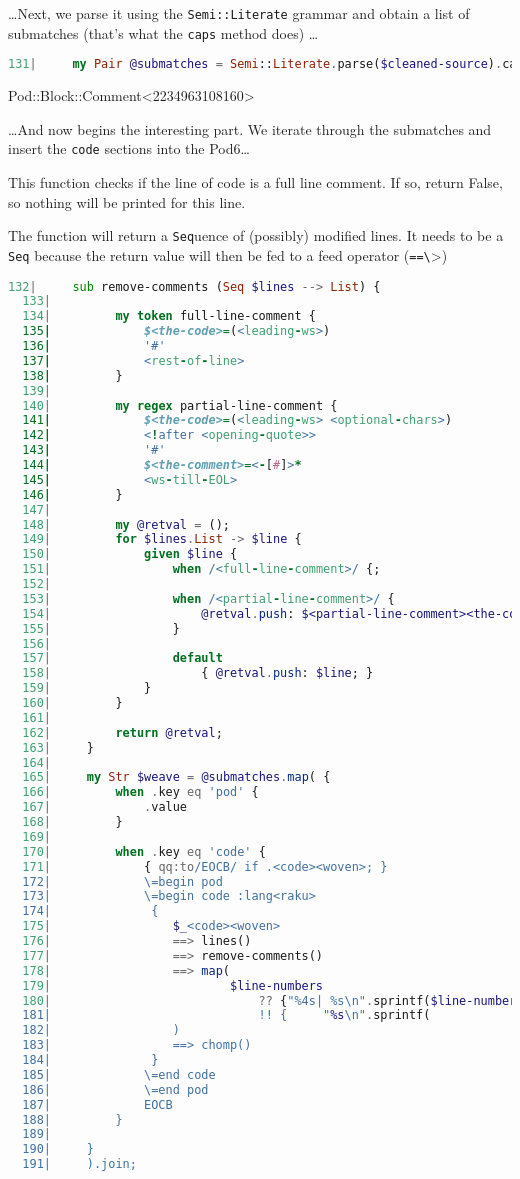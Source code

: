 \documentclass{scrartcl}
\begin{document}
…Next, we parse it using the \texttt{Semi::Literate} grammar and obtain a
list of submatches (that's what the \texttt{caps} method does) …

\begin{lstlisting}[language=Raku]
  131|     my Pair @submatches = Semi::Literate.parse($cleaned-source).caps;

\end{lstlisting}


Pod::Block::Comment<2234963108160>

…And now begins the interesting part. We iterate through the submatches and
insert the \texttt{code} sections into the Pod6…

This function checks if the line of code is a full line comment. If so,
return False, so nothing will be printed for this line.

The function will return a \texttt{Seq}uence of (possibly) modified lines.
It needs to be a \texttt{Seq} because the return value will then be fed to
a feed operator (\texttt{==\textbackslash }>)

\begin{lstlisting}[language=Raku]
  132|     sub remove-comments (Seq $lines --> List) {
  133| 
  134|         my token full-line-comment {
  135|             $<the-code>=(<leading-ws>)
  136|             '#'
  137|             <rest-of-line>
  138|         } 
  139| 
  140|         my regex partial-line-comment {
  141|             $<the-code>=(<leading-ws> <optional-chars>)  
  142|             <!after <opening-quote>>         
  143|             '#'                              
  144|             $<the-comment>=<-[#]>*           
  145|             <ws-till-EOL>
  146|         } 
  147| 
  148|         my @retval = ();
  149|         for $lines.List -> $line {
  150|             given $line {
  151|                 when /<full-line-comment>/ {; 
  152| 
  153|                 when /<partial-line-comment>/ {
  154|                     @retval.push: $<partial-line-comment><the-code>;
  155|                 }
  156| 
  157|                 default
  158|                     { @retval.push: $line; }
  159|             } 
  160|         } 
  161| 
  162|         return @retval;
  163|     } 
  164| 
  165|     my Str $weave = @submatches.map( {
  166|         when .key eq 'pod' {
  167|             .value
  168|         } 
  169| 
  170|         when .key eq 'code' {
  171|             { qq:to/EOCB/ if .<code><woven>; }
  172|             \=begin pod
  173|             \=begin code :lang<raku>
  174|              {
  175|                 $_<code><woven>
  176|                 ==> lines()
  177|                 ==> remove-comments()
  178|                 ==> map(
  179|                         $line-numbers
  180|                             ?? {"%4s| %s\n".sprintf($line-number++, $_) }
  181|                             !! {     "%s\n".sprintf(                $_) }
  182|                 )
  183|                 ==> chomp() 
  184|              }
  185|             \=end code
  186|             \=end pod
  187|             EOCB
  188|         } 
  189| 
  190|     } 
  191|     ).join;

\end{lstlisting}
\end{document}

